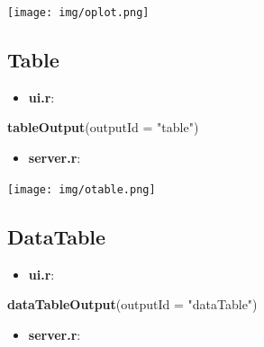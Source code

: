 \documentclass[
]{article}
\newenvironment{Shaded}{\begin{snugshade}}{\end{snugshade}}
\newcommand{\AttributeTok}[1]{\textcolor[rgb]{0.13,0.29,0.53}{#1}}
\newcommand{\FunctionTok}[1]{\textcolor[rgb]{0.13,0.29,0.53}{\textbf{#1}}}
\newcommand{\NormalTok}[1]{#1}
\newcommand{\OtherTok}[1]{\textcolor[rgb]{0.56,0.35,0.01}{#1}}
\newcommand{\SpecialCharTok}[1]{\textcolor[rgb]{0.81,0.36,0.00}{\textbf{#1}}}
\newcommand{\StringTok}[1]{\textcolor[rgb]{0.31,0.60,0.02}{#1}}
\providecommand{\tightlist}{%
  \setlength{\itemsep}{0pt}\setlength{\parskip}{0pt}}
\begin{document}
\texttt{[image: img/oplot.png]}

\hypertarget{table}{%
\subsection{Table}\label{table}}

\begin{itemize}
\tightlist
\item
  \textbf{ui.r}:
\end{itemize}

\begin{Shaded}
\begin{Highlighting}[]
\FunctionTok{tableOutput}\NormalTok{(}\AttributeTok{outputId =} \StringTok{"table"}\NormalTok{)}
\end{Highlighting}
\end{Shaded}

\begin{itemize}
\tightlist
\item
  \textbf{server.r}:
\end{itemize}

\begin{Shaded}
\end{Shaded}

\texttt{[image: img/otable.png]}

\hypertarget{datatable}{%
\subsection{DataTable}\label{datatable}}

\begin{itemize}
\tightlist
\item
  \textbf{ui.r}:
\end{itemize}

\begin{Shaded}
\begin{Highlighting}[]
\FunctionTok{dataTableOutput}\NormalTok{(}\AttributeTok{outputId =} \StringTok{"dataTable"}\NormalTok{)}
\end{Highlighting}
\end{Shaded}

\begin{itemize}
\tightlist
\item
  \textbf{server.r}:
\end{itemize}
\end{document}
